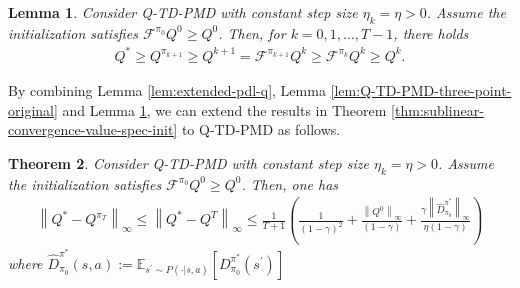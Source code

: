 \documentclass[10pt]{article}
\newcommand{\calF}{\mathcal{F}}
\theoremstyle{plain}
\newtheorem{theorem}{Theorem}[section]
\newtheorem{lemma}[theorem]{Lemma}
\theoremstyle{definition}
\begin{document}
\begin{lemma}
\label{lem:monotonicity-property-Q}
Consider Q-TD-PMD with constant step size $\eta_k=\eta>0$. Assume the initialization satisfies $\calF^{\pi_0} Q^0 \geq Q^0$.    Then, for $k=0,1,...,T-1$, there holds    
    \begin{align}
        Q^* \geq Q^{\pi_{k+1}} \geq Q^{k+1} = \calF^{\pi_{k+1}}Q^k \geq \calF^{\pi_k} Q^k \geq Q^k.
        \label{eq:monotonicity-property-Q}
    \end{align}
\end{lemma} 
By combining Lemma \ref{lem:extended-pdl-q}, Lemma \ref{lem:Q-TD-PMD-three-point-original} and  Lemma \ref{lem:monotonicity-property-Q}, we can extend the results in Theorem \ref{thm:sublinear-convergence-value-spec-init} to Q-TD-PMD as follows. 
\begin{theorem}
\label{thm:sublinear-convergence-value-spec-init-Q}    
 Consider Q-TD-PMD with constant step size $\eta_k=\eta>0$. Assume the initialization satisfies $\calF^{\pi_0} Q^0 \geq Q^0$. Then, one has
    \begin{align*}
\left\| Q^*-Q^{\pi _T} \right\| _{\infty}\le \left\| Q^*-Q^T \right\| _{\infty}\le \frac{1}{T+1}\left( \frac{1}{\left( 1-\gamma \right) ^2}+\frac{\left\| Q^0 \right\| _{\infty}}{\left( 1-\gamma \right)}+\frac{\gamma \left\| \hat{D}_{\pi _0}^{\pi ^*} \right\| _{\infty}}{\eta \left( 1-\gamma \right)} \right)
    \end{align*}
    where $\hat{D}_{\pi _0}^{\pi ^*}\left( s,a \right) :=\mathbb{E} _{s^\prime\sim P\left( \cdot |s,a \right)}\left[ D_{\pi _0}^{\pi ^*}\left( s^{\prime} \right) \right]$
\end{theorem}
\end{document}

